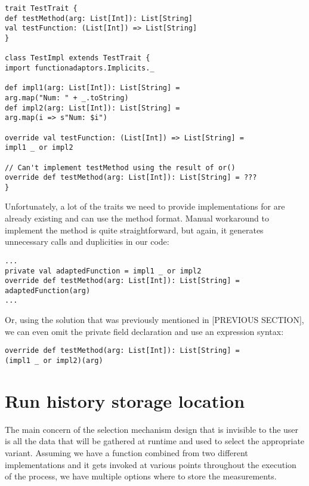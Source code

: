 \lstset{style=Scala}
\begin{lstlisting}
trait TestTrait {
def testMethod(arg: List[Int]): List[String]
val testFunction: (List[Int]) => List[String]
}

class TestImpl extends TestTrait {
import functionadaptors.Implicits._

def impl1(arg: List[Int]): List[String] = 
arg.map("Num: " + _.toString)
def impl2(arg: List[Int]): List[String] = 
arg.map(i => s"Num: $i")

override val testFunction: (List[Int]) => List[String] = 
impl1 _ or impl2

// Can't implement testMethod using the result of or()
override def testMethod(arg: List[Int]): List[String] = ???
}
\end{lstlisting}

Unfortunately, a lot of the traits we need to provide implementations for are already existing and can use the method format. Manual workaround to implement the method is quite straightforward, but again, it generates unnecessary calls and duplicities in our code:

\lstset{style=Scala}
\begin{lstlisting}
...
private val adaptedFunction = impl1 _ or impl2
override def testMethod(arg: List[Int]): List[String] = 
adaptedFunction(arg)
...
\end{lstlisting}

Or, using the solution that was previously mentioned in [PREVIOUS SECTION], we can even omit the private field declaration and use an expression syntax:

\lstset{style=Scala}
\begin{lstlisting}
override def testMethod(arg: List[Int]): List[String] = 
(impl1 _ or impl2)(arg)
\end{lstlisting}




\section{Run history storage location}
\label{sec:storing}

The main concern of the selection mechanism design that is invisible to the user is all the data that will be gathered at runtime and used to select the appropriate variant. Assuming we have a function combined from two different implementations and it gets invoked at various points throughout the execution of the process, we have multiple options where to store the measurements.

